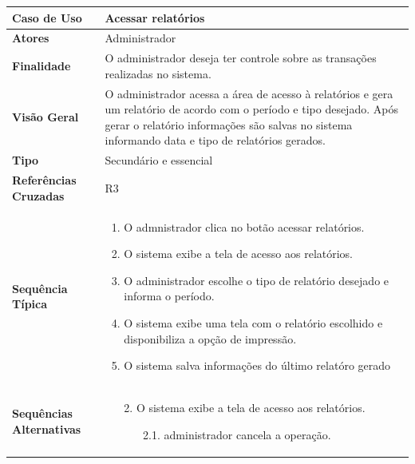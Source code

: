 \documentclass[a4paper,11pt]{article}
\begin{document}
\begin{table}[H]
		\begin{tabularx}{\textwidth}{|l|X|}
		\hline
			\textbf{Caso de Uso} &  Acessar relatórios \\ \hline
			\textbf{Atores} &  Administrador  \\ \hline
			\textbf{Finalidade} & O administrador deseja ter controle sobre as transações realizadas no sistema.  \\ \hline
			\textbf{Visão Geral} & O administrador acessa a área de acesso à relatórios e gera um relatório de acordo com o período e tipo desejado. Após gerar o relatório informações são salvas no sistema informando data e tipo de relatórios gerados.  \\ \hline
			\textbf{Tipo} & Secundário e essencial \\ \hline
			\textbf{Referências Cruzadas} & R3  \\ \hline
			\textbf{Sequência Típica} & 
			\begin{enumerate}
			\item O admnistrador clica no botão acessar relatórios.
			\item O sistema exibe a tela de acesso aos relatórios.
			\item O administrador escolhe o tipo de relatório desejado e informa o período.
			\item O sistema exibe uma tela com o relatório escolhido e disponibiliza a opção de impressão.
			\item O sistema salva informações do último relatóro gerado
			\end{enumerate} \\ \hline
			
			\textbf{Sequências Alternativas} & 
			\begin{itemize}
				\item[2.] O sistema exibe a tela de acesso aos relatórios.
				\begin{itemize}
					\item[2.1.] administrador cancela a operação.
				\end{itemize}
			\end{itemize} \\ \hline
		\end{tabularx}
\end{table}
\end{document}
